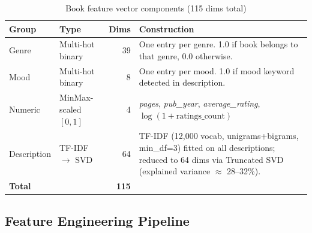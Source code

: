 \documentclass[12pt, a4paper]{article}
\begin{document}
\begin{table}[H]
\centering
\caption{Book feature vector components (115 dims total)}
\begin{tabularx}{\textwidth}{@{}llrX@{}}
\toprule
\textbf{Group} & \textbf{Type} & \textbf{Dims} & \textbf{Construction} \\
\midrule
Genre & Multi-hot binary & 39 &
  One entry per genre. 1.0 if book belongs to that genre, 0.0 otherwise. \\[4pt]
Mood & Multi-hot binary & 8 &
  One entry per mood. 1.0 if mood keyword detected in description. \\[4pt]
Numeric & MinMax-scaled $[0,1]$ & 4 &
  \emph{pages}, \emph{pub\_year}, \emph{average\_rating}, $\log(1+\text{ratings\_count})$ \\[4pt]
Description & TF-IDF $\to$ SVD & 64 &
  TF-IDF (12{,}000 vocab, unigrams+bigrams, min\_df=3) fitted on all
  descriptions; reduced to 64 dims via Truncated SVD
  (explained variance $\approx$ 28--32\%). \\
\midrule
\textbf{Total} & & \textbf{115} & \\
\bottomrule
\end{tabularx}
\end{table}

\subsection{Feature Engineering Pipeline}
\end{document}
